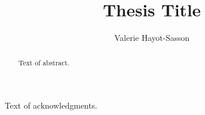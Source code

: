 
\author{Valerie Hayot-Sasson}
\title{Thesis Title}
\PhD                            %
\cosupervisor                   %




\begin{abstract}
  Text of abstract.  
\end{abstract}

\begin{acknowledgments}
  Text of acknowledgments.
\end{acknowledgments}




